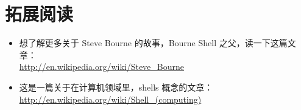 \section{拓展阅读} %
\label{sec:拓展阅读}

\begin{itemize}
	\item 想了解更多关于 Steve Bourne 的故事，Bourne Shell 之父，读一下这篇文章：\\
	\url{http://en.wikipedia.org/wiki/Steve_Bourne}\\
	\item 这是一篇关于在计算机领域里，shells 概念的文章：\\
	\url{http://en.wikipedia.org/wiki/Shell_(computing)}\\
\end{itemize}
